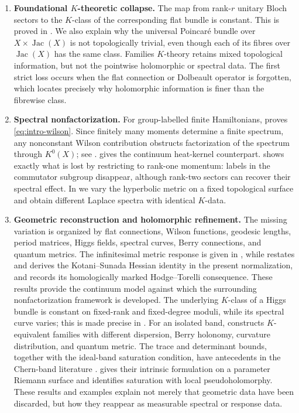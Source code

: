 \documentclass[11pt]{article}
\theoremstyle{definition}
\theoremstyle{remark}
\newcommand{\Jac}{\operatorname{Jac}}
\begin{document}
\begin{enumerate}[label=\textup{(\Roman*)},leftmargin=2.8em]
\item \textbf{Foundational \(K\)-theoretic collapse.}
  The map from rank-\(r\) unitary Bloch sectors to the \(K\)-class of the
  corresponding flat bundle is constant.  This is proved in
  .  We also explain why the universal Poincar\'e bundle
  over \(X\times\Jac(X)\) is not topologically trivial, even though each of its
  fibres over \(\Jac(X)\) has the same class.  Families \(K\)-theory retains
  mixed topological information, but not the pointwise holomorphic or spectral
  data.  The first strict loss occurs when the flat connection or Dolbeault
  operator is forgotten, which locates precisely why holomorphic information
  is finer than the fibrewise class.

\item \textbf{Spectral nonfactorization.}
  For group-labelled finite Hamiltonians,  proves
  \eqref{eq:intro-wilson}.  Since finitely many moments determine a finite
  spectrum, any nonconstant Wilson contribution obstructs factorization of
  the spectrum through \(K^0(X)\); see
  .   gives the
  continuum heat-kernel counterpart.   shows
  exactly what is lost by restricting to rank-one momentum: labels in the
  commutator subgroup disappear, although rank-two sectors can recover their
  spectral effect.  In  we vary the
  hyperbolic metric on a fixed topological surface and obtain different
  Laplace spectra with identical \(K\)-data.

\item \textbf{Geometric reconstruction and holomorphic refinement.}
  The missing variation is organized by flat connections, Wilson functions,
  geodesic lengths, period matrices, Higgs fields, spectral curves, Berry
  connections, and quantum metrics.  The infinitesimal metric response is
  given in , while 
  restates and derives the Kotani--Sunada Hessian identity in the present
  normalization, and  records its homologically
  marked Hodge--Torelli consequence.  These results provide the continuum
  model against which the surrounding nonfactorization framework is developed.
  The underlying \(K\)-class of a Higgs bundle is constant on fixed-rank and
  fixed-degree moduli, while its spectral curve varies; this is made precise
  in .  For an isolated band,
   constructs \(K\)-equivalent families with different
  dispersion, Berry holonomy, curvature distribution, and quantum metric.
  The trace and determinant bounds, together with the ideal-band saturation
  condition, have antecedents in the Chern-band literature
  \cite{Roy2014,MeraOzawaKahler,MeraOzawaFlat}.
   gives their intrinsic formulation on a
  parameter Riemann surface and identifies saturation with local
  pseudoholomorphy.  These results and examples explain not merely that
  geometric data have been discarded, but how they reappear as measurable
  spectral or response data.


\end{enumerate}
\end{document}
